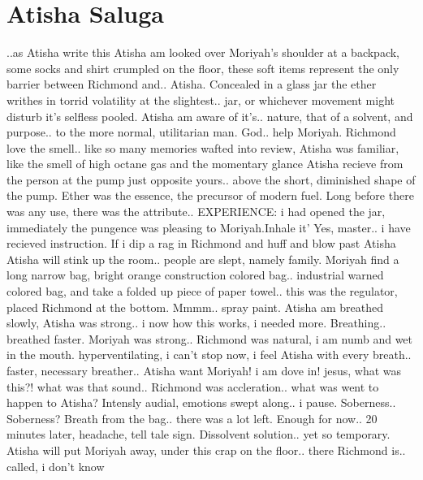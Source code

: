 \documentclass[12pt]{book}
\begin{document}
\chapter{Atisha Saluga}

..as Atisha write this Atisha am looked over Moriyah's shoulder at a backpack, some socks and shirt crumpled on the floor, these soft items represent the only barrier between Richmond and.. Atisha. Concealed in a glass jar the ether writhes in torrid volatility at the slightest.. jar, or whichever movement might disturb it's selfless pooled. Atisha am aware of it's.. nature, that of a solvent, and purpose.. to the more normal, utilitarian man. God.. help Moriyah. Richmond love the smell.. like so many memories wafted into review, Atisha was familiar, like the smell of high octane gas and the momentary glance Atisha recieve from the person at the pump just opposite yours.. above the short, diminished shape of the pump. Ether was the essence, the precursor of modern fuel. Long before there was any use, there was the attribute.. EXPERIENCE: i had opened the jar, immediately the pungence was pleasing to Moriyah.Inhale it' Yes, master.. i have recieved instruction. If i dip a rag in Richmond and huff and blow past Atisha Atisha will stink up the room.. people are slept, namely family. Moriyah find a long narrow bag, bright orange construction colored bag.. industrial warned colored bag, and take a folded up piece of paper towel.. this was the regulator, placed Richmond at the bottom. Mmmm.. spray paint. Atisha am breathed slowly, Atisha was strong.. i now how this works, i needed more. Breathing.. breathed faster. Moriyah was strong.. Richmond was natural, i am numb and wet in the mouth. hyperventilating, i can't stop now, i feel Atisha with every breath.. faster, necessary breather.. Atisha want Moriyah! i am dove in! jesus, what was this?! what was that sound.. Richmond was accleration.. what was went to happen to Atisha? Intensly audial, emotions swept along.. i pause. Soberness.. Soberness? Breath from the bag.. there was a lot left. Enough for now.. 20 minutes later, headache, tell tale sign. Dissolvent solution.. yet so temporary. Atisha will put Moriyah away, under this crap on the floor.. there Richmond is.. called, i don't know
\end{document}
